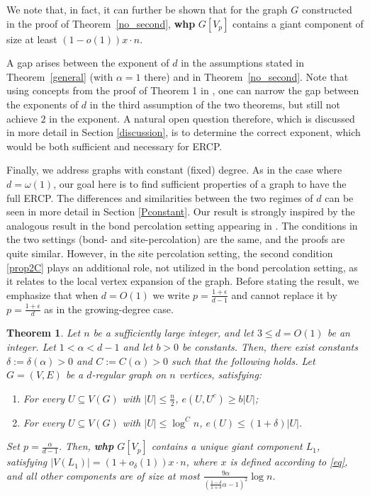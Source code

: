 \documentclass[notitlepage]{scrartcl}
\newtheorem{theorem}{Theorem}
\begin{document}
We note that, in fact, it can further be shown that for the graph $G$ constructed in the proof of Theorem~\ref{no_second}, \textbf{whp} $G[V_p]$ contains a giant component of size at least $(1-o(1))x\cdot n$.

A gap arises between the exponent of $d$ in the assumptions stated in Theorem~\ref{general} (with $\alpha=1$ there) and in Theorem~\ref{no_second}. Note that using concepts from the proof of Theorem 1 in \cite{diskin2025componentslargesmalli}, one can narrow the gap between the exponents of $d$ in the third assumption of the two theorems, but still not achieve $2$ in the exponent. A natural open question therefore, which is discussed in more detail in Section \ref{discussion}, is to determine the correct exponent, which would be both sufficient and necessary for ERCP.

Finally, we address graphs with constant (fixed) degree. As in the case where $d=\omega(1)$, our goal here is to find sufficient properties of a graph to have the full ERCP. The differences and similarities between the two regimes of $d$ can be seen in more detail in Section \ref{Pconstant}. Our result is strongly inspired by the analogous result in the bond percolation setting appearing in \cite{zbMATH08098276}. The conditions in the two settings (bond- and site-percolation) are the same, and the proofs are quite similar. However, in the site percolation setting, the second condition \ref{prop2C} plays an additional role, not utilized in the bond percolation setting, as it relates to the local vertex expansion of the graph. Before stating the result, we emphasize that when $d=O(1)$ we write $p=\frac{1+\epsilon}{d-1}$ and cannot replace it by $p=\frac{1+\epsilon}{d}$ as in the growing-degree case.

\begin{theorem}\label{constant}
    Let $n$ be a sufficiently large integer, and let $3\le d=O(1)$ be an integer. Let $1<\alpha<d-1$ and let $b>0$ be constants. Then, there exist constants $\delta:=\delta(\alpha)>0$ and $C:=C(\alpha)>0$ such that the following holds.
    Let $G=(V,E)$ be a $d$-regular graph on $n$ vertices, satisfying:
    \begin{enumerate}[(R\arabic*{})]
        \item For every $U\subseteq V(G)$ with $|U|\leq \frac{n}{2}$, $e(U,U^c)\geq b|U|$; \label{prop0C}
        \item For every $U\subseteq V(G)$ with $|U|\leq \log^C n$, $e(U)\le \left(1+\delta\right)|U|$. \label{prop2C}
    \end{enumerate}
    Set $p=\frac{\alpha}{d-1}$. Then, \textbf{whp} $G[V_p]$ contains a unique giant component $L_1$, satisfying $|V(L_1)| = (1 + o_\delta(1))x\cdot n$, where $x$ is defined according to \eqref{eq}, and all other components are of size at most $\frac{9\alpha}{\left(\frac{1-\delta}{1+\delta}\alpha-1\right)^2}\log n$.
\end{theorem}
\end{document}
